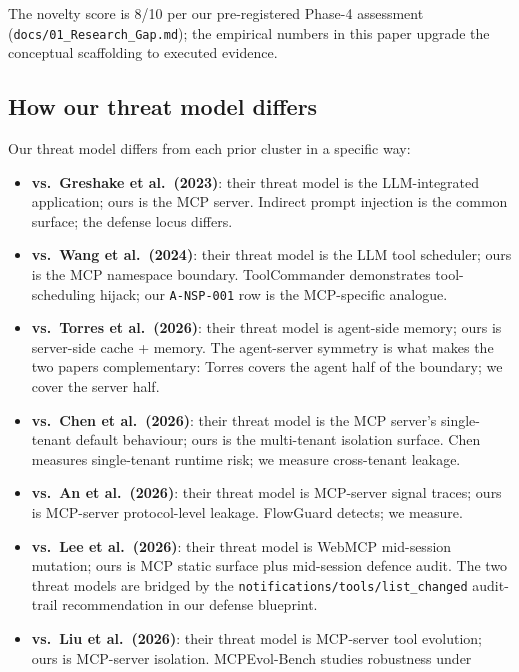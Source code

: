 The novelty score is 8/10 per our pre-registered Phase-4
assessment (\texttt{docs/01\_Research\_Gap.md}); the
empirical numbers in this paper upgrade the conceptual
scaffolding to executed evidence.

\subsection{How our threat model differs}

Our threat model differs from each prior cluster in a specific
way:

\begin{itemize}
  \item \textbf{vs.\ Greshake et al.~(2023)}: their threat
        model is the LLM-integrated application; ours is the
        MCP server. Indirect prompt injection is the common
        surface; the defense locus differs.
  \item \textbf{vs.\ Wang et al.~(2024)}: their threat model
        is the LLM tool scheduler; ours is the MCP namespace
        boundary. ToolCommander demonstrates tool-scheduling
        hijack; our \texttt{A-NSP-001} row is the MCP-specific
        analogue.
  \item \textbf{vs.\ Torres et al.~(2026)}: their threat model
        is agent-side memory; ours is server-side cache +
        memory. The agent-server symmetry is what makes the
        two papers complementary: Torres covers the agent
        half of the boundary; we cover the server half.
  \item \textbf{vs.\ Chen et al.~(2026)}: their threat model
        is the MCP server's single-tenant default behaviour;
        ours is the multi-tenant isolation surface. Chen
        measures single-tenant runtime risk; we measure
        cross-tenant leakage.
  \item \textbf{vs.\ An et al.~(2026)}: their threat model is
        MCP-server signal traces; ours is MCP-server
        protocol-level leakage. FlowGuard detects; we measure.
  \item \textbf{vs.\ Lee et al.~(2026)}: their threat model
        is WebMCP mid-session mutation; ours is MCP static
        surface plus mid-session defence audit. The two
        threat models are bridged by the
        \texttt{notifications/tools/list\_changed} audit-trail
        recommendation in our defense blueprint.
  \item \textbf{vs.\ Liu et al.~(2026)}: their threat model is
        MCP-server tool evolution; ours is MCP-server
        isolation. MCPEvol-Bench studies robustness under

\end{itemize}
